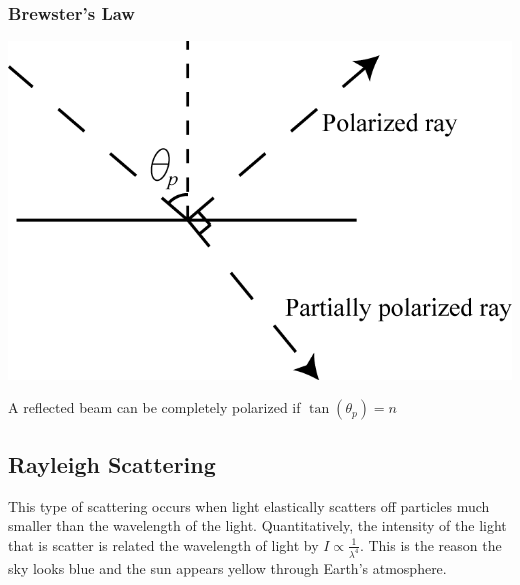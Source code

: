 \subsubsection{Brewster's Law}
\begin{center}
\includegraphics[scale=0.6]{images/PGRE_Figures_3p5p2_Brewsters_Law.png}
\end{center}
A reflected beam can be completely polarized if \(\tan(\theta_p)=n\)

\subsection{Rayleigh Scattering}
This type of scattering occurs when light elastically scatters off particles much smaller than the wavelength of the light.
Quantitatively, the intensity of the light that is scatter is related the wavelength of light by \(\displaystyle I\propto\frac{1}{\lambda^4}\).
This is the reason the sky looks blue and the sun appears yellow through Earth's atmosphere.
